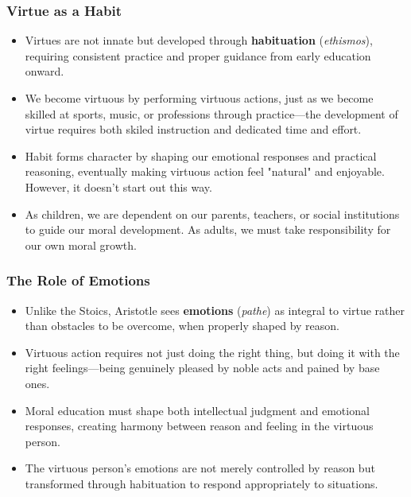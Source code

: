 \documentclass{beamer}
\begin{document}
\begin{frame}
    \frametitle{Virtue as a Habit}
    \begin{itemize}
        \item Virtues are not innate but developed through \textbf{habituation} (\textit{ethismos}), requiring consistent practice and proper guidance from early education onward.
        
        \item We become virtuous by performing virtuous actions, just as we become skilled at sports, music, or professions through practice—the development of virtue requires both skiled instruction and dedicated time and effort.
        
        \item Habit forms character by shaping our emotional responses and practical reasoning, eventually making virtuous action feel "natural" and enjoyable. However, it doesn't start out this way.
        
        \item As children, we are dependent on our parents, teachers, or social institutions to guide our moral development. As adults, we must take responsibility for our own moral growth.
    \end{itemize}
\end{frame}

\begin{frame}
    \frametitle{The Role of Emotions}
    \begin{itemize}
        \item Unlike the Stoics, Aristotle sees \textbf{emotions} (\textit{pathe}) as integral to virtue rather than obstacles to be overcome, when properly shaped by reason.
        
        \item Virtuous action requires not just doing the right thing, but doing it with the right feelings—being genuinely pleased by noble acts and pained by base ones.
        
        \item Moral education must shape both intellectual judgment and emotional responses, creating harmony between reason and feeling in the virtuous person.
        
        \item The virtuous person's emotions are not merely controlled by reason but transformed through habituation to respond appropriately to situations.
    \end{itemize}
\end{frame}
\end{document}
